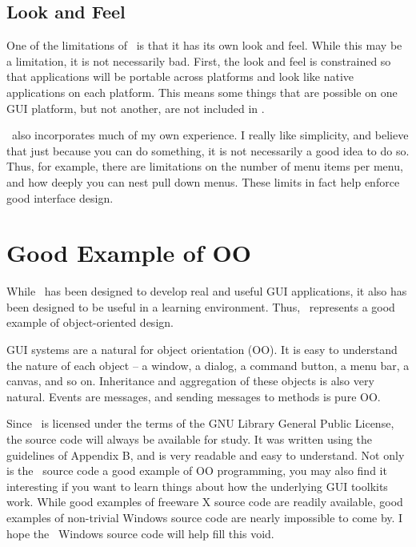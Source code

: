 \subsection*{Look and Feel}

One of the limitations of \V\ is that it has its own look and feel.
While this may be a limitation, it is not necessarily bad. First,
the look and feel is constrained so that applications will be portable
across platforms and look like native applications on each platform.
This means some things that are possible on one GUI platform, but
not another, are not included in \V\@.

\V\ also incorporates much of my own experience. I really like
simplicity, and believe that just because you can do something,
it is not necessarily a good idea to do so. Thus, for example,
there are limitations on the number of menu items per menu, and
how deeply you can nest pull down menus. These limits in fact
help enforce good interface design.

\section{Good Example of OO}

While \V\ has been designed to develop real and useful GUI
applications, it also has been designed to be useful in a
learning environment. Thus, \V\ represents a good example of
object-oriented design. 

GUI systems are a natural for object orientation (OO). It is easy
to understand the nature of each object -- a window, a dialog, a
command button, a menu bar, a canvas, and so on. Inheritance and
aggregation of these objects is also very natural. Events are
messages, and sending messages to methods is pure OO.

Since \V\ is licensed under the terms of the GNU Library General
Public License, the source code will always be available for
study. It was written using the guidelines of Appendix B, and is
very readable and easy to understand. Not only is the \V\ source
code a good example of OO programming, you may also find it
interesting if you want to learn things about how the
underlying GUI toolkits work. While good examples of freeware X
source code are readily available, good examples of non-trivial
Windows source code are nearly impossible to come by. I hope the
\V\ Windows source code will help fill this void.


